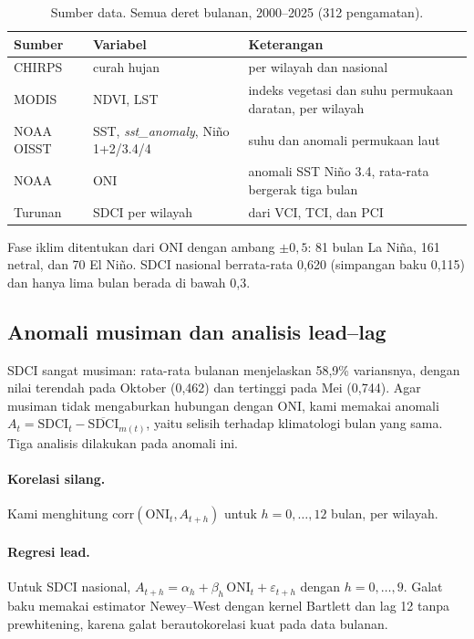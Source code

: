 \documentclass[11pt,twoside]{article}
\begin{document}
\begin{table}[ht]
\centering
\caption{Sumber data. Semua deret bulanan, 2000--2025 (312 pengamatan).}
\label{Tab:Data}
\small
\begin{tabular}{llp{6.2cm}}
\toprule
Sumber & Variabel & Keterangan \\
\midrule
CHIRPS \cite{funk2015chirps} & curah hujan & per wilayah dan nasional \\
MODIS & NDVI, LST & indeks vegetasi dan suhu permukaan daratan, per wilayah \\
NOAA OISST \cite{huang2021oisst} & SST, \textit{sst\_anomaly}, Ni\~no 1+2/3.4/4 & suhu dan anomali permukaan laut \\
NOAA & ONI \cite{trenberth1997enso} & anomali SST Ni\~no 3.4, rata-rata bergerak tiga bulan \\
Turunan & SDCI per wilayah & dari VCI, TCI, dan PCI \\
\bottomrule
\end{tabular}
\end{table}

Fase iklim ditentukan dari ONI dengan ambang $\pm 0{,}5$: 81 bulan La Ni\~na, 161 netral, dan 70 El Ni\~no. SDCI nasional berrata-rata 0,620 (simpangan baku 0,115) dan hanya lima bulan berada di bawah 0,3.

\subsection{Anomali musiman dan analisis lead--lag}
\label{SubSec:LeadLag}

SDCI sangat musiman: rata-rata bulanan menjelaskan 58,9\% variansnya, dengan nilai terendah pada Oktober (0,462) dan tertinggi pada Mei (0,744). Agar musiman tidak mengaburkan hubungan dengan ONI, kami memakai anomali $A_t = \mathrm{SDCI}_t - \overline{\mathrm{SDCI}}_{m(t)}$, yaitu selisih terhadap klimatologi bulan yang sama. Tiga analisis dilakukan pada anomali ini.

\paragraph{Korelasi silang.} Kami menghitung $\mathrm{corr}(\mathrm{ONI}_t, A_{t+h})$ untuk $h = 0,\dots,12$ bulan, per wilayah.

\paragraph{Regresi lead.} Untuk SDCI nasional, $A_{t+h} = \alpha_h + \beta_h\,\mathrm{ONI}_t + \varepsilon_{t+h}$ dengan $h = 0,\dots,9$. Galat baku memakai estimator Newey--West \cite{newey1987hac} dengan kernel Bartlett dan lag 12 tanpa prewhitening, karena galat berautokorelasi kuat pada data bulanan.
\end{document}
